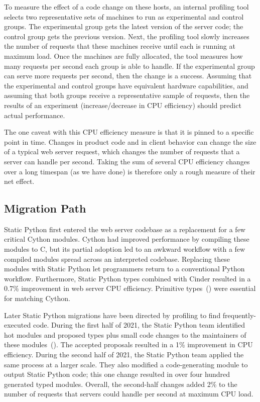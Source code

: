 \documentclass[english,cleveref,crc]{programming}
\newcommand{\SP}{Static Python}
\newcommand{\CPUchange}{3.7\%}
\begin{document}
To measure the effect of a code change on these hosts, an internal profiling tool selects
two representative sets of machines to run as experimental and control groups.
The experimental group gets the latest version of the server code;
the control group gets the previous version.
Next, the profiling tool slowly increases the number of requests that these
machines receive until each is running at maximum load.
Once the machines are fully allocated, the tool measures how many requests
per second each group is able to handle.
If the experimental group can serve more requests per second, then the change
is a success.
Assuming that the experimental and control groups have equivalent hardware
capabilities, and assuming that both groups receive a representative sample
of requests, then the results of an experiment (increase/decrease in CPU efficiency)
should predict actual performance.

The one caveat with this CPU efficiency measure is that it is pinned
to a specific point in time.
Changes in product code and in client behavior can change the size
of a typical web server request, which changes the number
of requests that a server can handle per second.
Taking the sum of several CPU efficiency changes over a long
timespan (as we have done) is therefore only a rough
measure of their net effect.


\subsection{Migration Path}
\label{s:migration-path}

\SP{} first entered the web server codebase as a replacement for a
few critical Cython modules.
Cython had improved performance by compiling these modules to C,
but its partial adoption led to an awkward workflow with a
few compiled modules spread across an interpreted codebase.
Replacing these modules with \SP{} let programmers return to a conventional
Python workflow.
Furthermore, \SP{} types combined with Cinder resulted in a
0.7\% improvement in web server CPU efficiency.
Primitive types~() were essential for matching Cython.

Later \SP{} migrations have been directed by profiling to find frequently-executed code.
During the first half of 2021, the \SP{} team identified hot
modules and proposed types plus small code changes to the maintainers of these modules~().
The accepted proposals resulted in a 1\% improvement in CPU efficiency.
During the second half of 2021, the \SP{} team applied the same
process at a larger scale.
They also modified a code-generating module to output \SP{} code;
this one change resulted in over four hundred generated typed modules.
Overall, the second-half changes added 2\% to the number of requests
that servers could handle per second at maximum CPU load.
\end{document}
